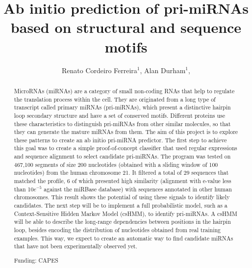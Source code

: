 \documentclass[twoside]{article}
\title{\vspace{-15mm}\fontsize{24pt}{10pt}\selectfont\textbf{ Ab initio prediction of pri-miRNAs based on structural and sequence motifs }} %
\author{ Renato Cordeiro Ferreira$^{1}$, Alan Durham$^{1}$, }
\affil{ 1 IME

 }
\date{}
\begin{document}
  
  
  \maketitle %
  
  
  \thispagestyle{fancy} %
  
  
  \begin{abstract}
  MicroRNAs (miRNAs) are a category of small non-coding RNAs that help to regulate the translation process within the cell. They are originated from a long type of transcript called primary miRNAs (pri-miRNAs), which present a distinctive hairpin loop secondary structure and have a set of conserved motifs. Different proteins use these characteristics to distinguish pri-miRNAs from other similar molecules, so that they can generate the mature miRNAs from them. The aim of this project is to explore these patterns to create an ab initio pri-miRNA predictor. The first step to achieve this goal was to create a simple proof-of-concept classifier that used regular expressions and sequence alignment to select candidate pri-miRNAs. The program was tested on 467,100 segments of size 200 nucleotides (obtained with a sliding window of 100 nucleotides) from the human chromosome 21. It filtered a total of 29 sequences that matched the profile, 6 of which presented high similarity (alignment with e-value less than 10$e^{-5}$ against the miRBase database) with sequences annotated in other human chromosomes. This result shows the potential of using these signals to identify likely candidates. The next step will be to implement a full probabilistic model, such as a Context-Sensitive Hidden Markov Model (csHMM), to identify pri-miRNAs. A csHMM will be able to describe the long-range dependencies between positions in the hairpin loop, besides encoding the distribution of nucleotides obtained from real training examples. This way, we expect to create an automatic way to find candidate miRNAs that have not been experimentally observed yet.
  
  Funding: CAPES \\ 
  \end{abstract}
  
\end{document}
